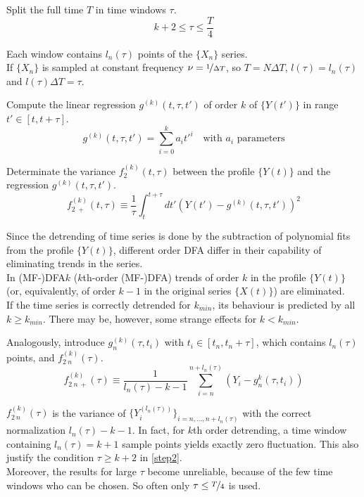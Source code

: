 \begin{step}\label{step2}
Split the full time $T$ in time windows $\tau$.
\begin{equation*}
	k+2 \le \tau \le \frac{T}{4}
\end{equation*}

Each window contains $l_n(\tau)$ points of the $\{X_n\}$ series. \\
If $\{X_n\}$ is sampled at constant frequency $\nu = \nicefrac{1}{\Delta T}$, so $T = N \Delta T$, $l(\tau) = l_n(\tau)$ and $l(\tau) \Delta T = \tau $. 
\end{step}

\begin{step}\label{step3}
Compute the linear regression $ g^{( k )}(t, \tau, t') $ of order $k$ of $\{Y(t')\}$ in range $t' \in \left[t, t + \tau \right]$.
\begin{equation*}
	g^{( k )}(t, \tau, t') = \sum_{i=0}^{k} a_i t'^{i} \quad \text{with $a_i$ parameters}
\end{equation*}

Determinate the variance $ f_2^{( k )}( t, \tau ) $ between the profile $\{Y(t)\}$ and the regression $ g^{( k )}(t, \tau, t') $.
\begin{equation*}
	f_{2 \ +}^{( k )}( t, \tau ) \equiv \frac{1}{\tau} \int_{t}^{t+\tau} dt' \left( Y( t' ) - g^{( k )}(t, \tau, t')  \right)^2
\end{equation*}

Since the detrending of time series is done by the subtraction of polynomial fits from the profile $\{Y(t)\}$, different order DFA differ in their capability of eliminating trends in the series.\\
In (MF-)DFA$k$ ($k$th-order (MF-)DFA) trends of order $k$ in the profile $\{Y(t)\}$ (or, equivalently, of order $k-1$ in the original series $\{X(t)\}$) are eliminated. \\
If the time series is correctly detrended for $k_{min}$, its behaviour is predicted by all $k \ge k_{min}$. There may be, however, some strange effects for $k < k_{min}$.

Analogously, introduce $g_n^{(k)}(\tau, t_i)$ with $t_i \in [t_n, t_n + \tau]$, which contains $l_n(\tau)$ points, and $f_{2\ n}^{( k )}( \tau )$.
\begin{equation*}
	f_{2\ n \ +}^{( k )}( \tau ) \equiv \frac{1}{l_n(\tau) - k - 1} \sum_{i=n}^{n + l_n(\tau)} \left(Y_i - g_n^{k} (\tau, t_i) \right)
\end{equation*}

$f_{2\ n}^{( k )}( \tau )$ is the variance of $\{ Y^{(l_n(\tau))}_i\}_{i= n, \dots, n+l_n(\tau)} $ with the correct normalization $l_n(\tau) - k - 1$. In fact, for $k$th order detrending, a time window containing $l_n(\tau) = k + 1$ sample points yields exactly zero fluctuation. This also justify the condition $\tau \ge k+2$ in \autoref{step2}.\\
Moreover, the results for large $\tau$ become unreliable, because of the few time windows who can be chosen. So often only $\tau \le \nicefrac{T}{4}$ is used. 


\end{step}

